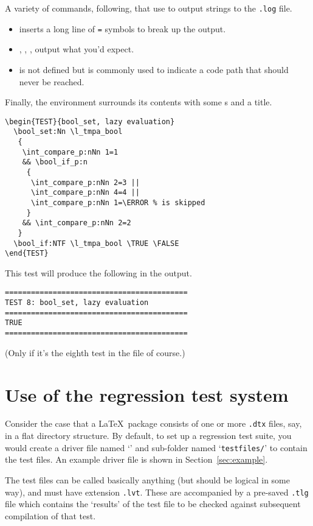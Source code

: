 \documentclass[a4paper]{ltugboat}
\begin{document}
A variety of commands, following, that use  to output strings to the \texttt{.log} file.
\begin{itemize}
\item
{} inserts a long line of \texttt{=} symbols to break up the output.
\item
{}, , ,  output what you'd expect.
\item
{} is not defined but is commonly used to indicate a code path that should never be reached.
\end{itemize}
Finally, the  environment surrounds its contents with some s and a title.
\begin{Verbatim}
\begin{TEST}{bool_set, lazy evaluation}
  \bool_set:Nn \l_tmpa_bool
   {
    \int_compare_p:nNn 1=1
    && \bool_if_p:n
     {
      \int_compare_p:nNn 2=3 ||
      \int_compare_p:nNn 4=4 ||
      \int_compare_p:nNn 1=\ERROR % is skipped
     }
    && \int_compare_p:nNn 2=2
   }
  \bool_if:NTF \l_tmpa_bool \TRUE \FALSE
\end{TEST}
\end{Verbatim}
This test will produce the following in the output.
\begin{Verbatim}
==========================================
TEST 8: bool_set, lazy evaluation
==========================================
TRUE
==========================================
\end{Verbatim}
(Only if it's the eighth test in the file of course.)

\section{Use of the regression test system}

Consider the case that a \LaTeX\ package consists of one or more \texttt{.dtx} files, say, in a flat directory structure.
By default, to set up a regression test suite, you would create a driver file named `\texttt{\drivername}' and sub-folder named `\texttt{testfiles/}' to contain the test files.
An example driver file is shown in Section~\ref{sec:example}.

The test files can be called basically anything (but should be logical in some way), and must have extension \texttt{.lvt}.
These are accompanied by a pre-saved \texttt{.tlg} file which contains the `results' of the test file to be checked against subsequent compilation of that test.
\end{document}
